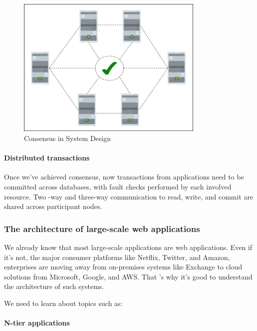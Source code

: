 \begin{figure}[htbp]
 \centering
 \includegraphics[width=0.8\textwidth]{Images/chapter_1/section_4705505809661952/5038218840244224.png}
 \caption{Consensus in System Design}
\end{figure}

\paragraph{Distributed transactions}\label{A1p1J6i6wVyaN0N9gZ-t3}

Once we've achieved consensus, now transactions from applications need to be committed across databases, with fault checks performed by each involved resource. Two -way and three-way communication to read, write, and commit are shared across participant nodes.

\subsubsection{The architecture of large-scale web applications}\label{3p8svxAoCHpdZLejxHViu}

We already know that most large-scale applications are web applications. Even if it's not, the major consumer platforms like Netflix, Twitter, and Amazon, enterprises are moving away from on-premises systems like Exchange to cloud solutions from Microsoft, Google, and AWS. That 's why it's good to understand the architecture of such systems.

We need to learn about topics such as:

\paragraph{N-tier applications}\label{w2_JW1jZ-X5kbVp55LzMo}

